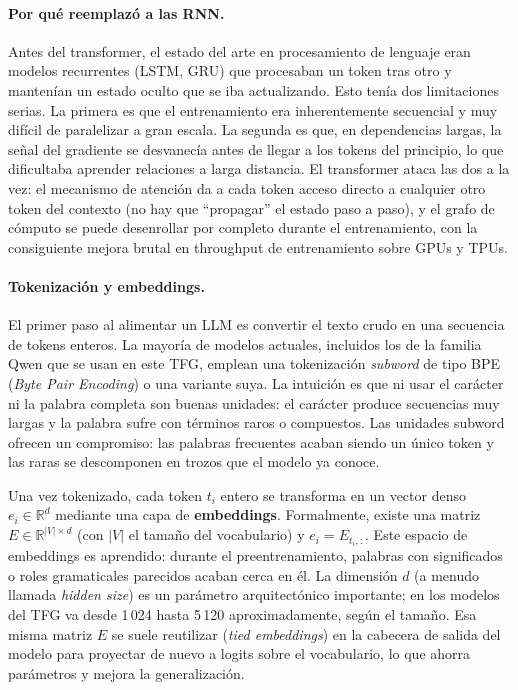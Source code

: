 \documentclass[11pt,a4paper]{article}
\begin{document}
\paragraph{Por qué reemplazó a las RNN.} Antes del transformer, el estado del arte en procesamiento de lenguaje eran modelos recurrentes (LSTM, GRU) que procesaban un token tras otro y mantenían un estado oculto que se iba actualizando. Esto tenía dos limitaciones serias. La primera es que el entrenamiento era inherentemente secuencial y muy difícil de paralelizar a gran escala. La segunda es que, en dependencias largas, la señal del gradiente se desvanecía antes de llegar a los tokens del principio, lo que dificultaba aprender relaciones a larga distancia. El transformer ataca las dos a la vez: el mecanismo de atención da a cada token acceso directo a cualquier otro token del contexto (no hay que ``propagar'' el estado paso a paso), y el grafo de cómputo se puede desenrollar por completo durante el entrenamiento, con la consiguiente mejora brutal en throughput de entrenamiento sobre GPUs y TPUs.

\paragraph{Tokenización y embeddings.} El primer paso al alimentar un LLM es convertir el texto crudo en una secuencia de tokens enteros. La mayoría de modelos actuales, incluidos los de la familia Qwen que se usan en este TFG, emplean una tokenización \textit{subword} de tipo BPE (\textit{Byte Pair Encoding}) o una variante suya. La intuición es que ni usar el carácter ni la palabra completa son buenas unidades: el carácter produce secuencias muy largas y la palabra sufre con términos raros o compuestos. Las unidades subword ofrecen un compromiso: las palabras frecuentes acaban siendo un único token y las raras se descomponen en trozos que el modelo ya conoce.

Una vez tokenizado, cada token $t_i$ entero se transforma en un vector denso $e_i \in \mathbb{R}^{d}$ mediante una capa de \textbf{embeddings}. Formalmente, existe una matriz $E \in \mathbb{R}^{|V|\times d}$ (con $|V|$ el tamaño del vocabulario) y $e_i = E_{t_i,:}$. Este espacio de embeddings es aprendido: durante el preentrenamiento, palabras con significados o roles gramaticales parecidos acaban cerca en él. La dimensión $d$ (a menudo llamada \textit{hidden size}) es un parámetro arquitectónico importante; en los modelos del TFG va desde 1\,024 hasta 5\,120 aproximadamente, según el tamaño. Esa misma matriz $E$ se suele reutilizar (\textit{tied embeddings}) en la cabecera de salida del modelo para proyectar de nuevo a logits sobre el vocabulario, lo que ahorra parámetros y mejora la generalización.
\end{document}
